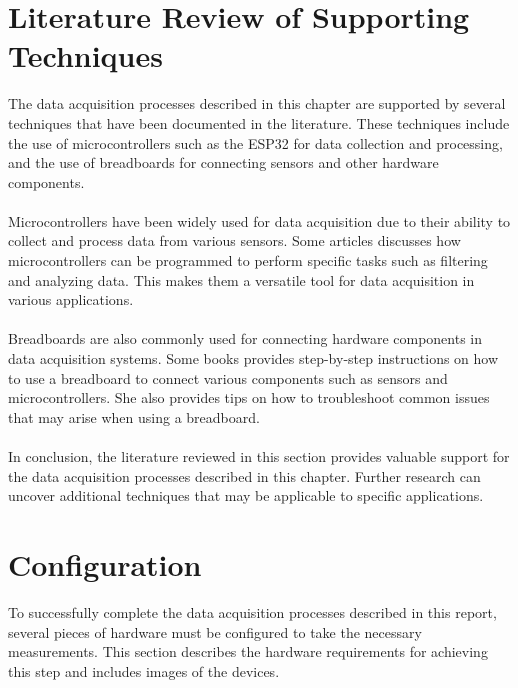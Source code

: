 \documentclass{report}
\begin{document}
\section{Literature Review of Supporting Techniques} The data acquisition processes described in this chapter are supported by several techniques that have been documented in the literature. These techniques include the use of microcontrollers such as the ESP32 for data collection and processing, and the use of breadboards for connecting sensors and other hardware components.\\
\\
Microcontrollers have been widely used for data acquisition due to their ability to collect and process data from various sensors. Some articles discusses how microcontrollers can be programmed to perform specific tasks such as filtering and analyzing data. This makes them a versatile tool for data acquisition in various applications\cite{Smith2018}.\\
\\
Breadboards are also commonly used for connecting hardware components in data acquisition systems. Some books provides step-by-step instructions on how to use a breadboard to connect various components such as sensors and microcontrollers. She also provides tips on how to troubleshoot common issues that may arise when using a breadboard\cite{Doe2017}.\\
\\
In conclusion, the literature reviewed in this section provides valuable support for the data acquisition processes described in this chapter. Further research can uncover additional techniques that may be applicable to specific applications.
\section{Configuration}
To successfully complete the data acquisition processes described in this report, several pieces of hardware must be configured to take the necessary measurements. This section describes the hardware requirements for achieving this step and includes images of the devices.
\end{document}
